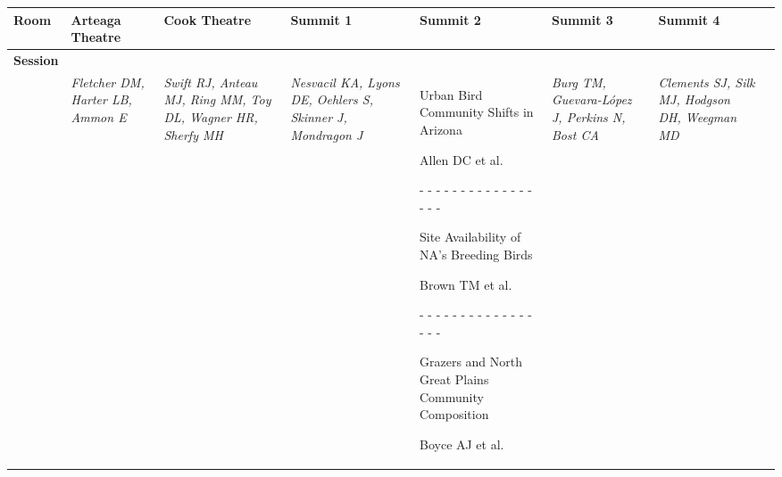 \begin{tabular}{|x{0.8cm}|x{2.65cm}|x{2.65cm}|x{2.65cm}|x{2.65cm}|x{2.65cm}|x{2.65cm}|@{}m{0pt}@{}}\hline
Room & Arteaga Theatre & Cook Theatre & Summit 1 & Summit 2 & Summit 3 & Summit 4&\\
\hline
\rule{0pt}{1em} \textbf{Session} &\footnotesize \textbf{} & \footnotesize \textbf{} & \footnotesize \textbf{} & \footnotesize \textbf{} & \footnotesize \textbf{} & \footnotesize \textbf{}&\\[25ex]
\hline
{}& \par \vspace{8pt} \textit{Fletcher DM, Harter LB, Ammon E} &  \par \vspace{8pt} \textit{Swift RJ, Anteau MJ, Ring MM, Toy DL, Wagner HR, Sherfy MH} &  \par \vspace{8pt} \textit{Nesvacil KA, Lyons DE, Oehlers S, Skinner J, Mondragon J} & \scriptsize Urban Bird Community Shifts in Arizona\par \tiny Allen DC et al. \par - - - - - - - - - - - - - - - - - \par \vspace{2pt} \scriptsize Site Availability of NA's Breeding Birds\par \tiny Brown TM et al. \par - - - - - - - - - - - - - - - - - \par \vspace{2pt} \scriptsize Grazers and North Great Plains Community Composition\par \tiny Boyce AJ et al.  &  \par \vspace{8pt} \textit{Burg TM, Guevara-L\'{o}pez J, Perkins N, Bost CA} &  \par \vspace{8pt} \textit{Clements SJ, Silk MJ, Hodgson DH, Weegman MD}&\\[25ex]

\end{tabular}

